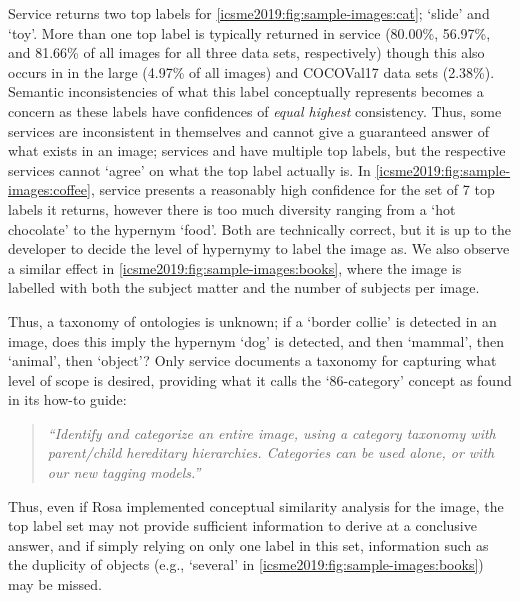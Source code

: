 Service \awsapi{} returns two top labels for \cref{icsme2019:fig:sample-images:cat}; `slide' and `toy'. More than one top label is typically returned in service \awsapi{} (80.00\%, 56.97\%, and 81.66\% of all images for all three data sets, respectively) though this also occurs in \azureapi{} in the large (4.97\% of all images) and COCOVal17 data sets (2.38\%). Semantic inconsistencies of what this label conceptually represents becomes a concern as these labels have confidences of \textit{equal highest} consistency. Thus, some services are inconsistent in themselves and cannot give a guaranteed answer of what exists in an image; services \awsapi{} and \azureapi{} have multiple top labels, but the respective services cannot `agree' on what the top label actually is. In \cref{icsme2019:fig:sample-images:coffee}, service \awsapi{} presents a reasonably high confidence for the set of 7 top labels it returns, however there is too much diversity ranging from a `hot chocolate' to the hypernym `food'. Both are technically correct, but it is up to the developer to decide the level of hypernymy to label the image as. We also observe a similar effect in \cref{icsme2019:fig:sample-images:books}, where the image is labelled with both the subject matter and the number of subjects per image.

Thus, a taxonomy of ontologies is unknown; if a `border collie' is detected in an image, does this imply the hypernym `dog' is detected, and then `mammal', then `animal', then `object'? Only service \azureapi{} documents a taxonomy for capturing what level of scope is desired, providing what it calls the `86-category' concept as found in its how-to guide:

\begin{quote}
  \itshape
  ``Identify and categorize an entire image, using a category taxonomy with parent/child hereditary hierarchies. Categories can be used alone, or with our new tagging models.'' 
  \upshape{}
\end{quote}

 Thus, even if Rosa implemented conceptual similarity analysis for the image, the top label set may not provide sufficient information to derive at a conclusive answer, and if simply relying on only one label in this set, information such as the duplicity of objects (e.g., `several' in \cref{icsme2019:fig:sample-images:books}) may be missed.


